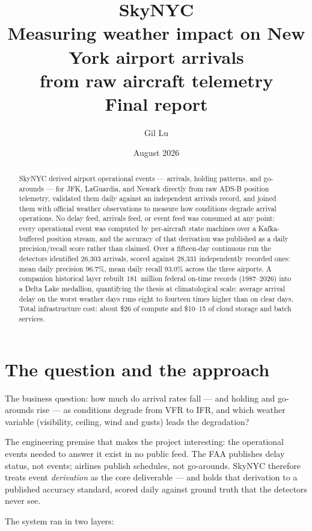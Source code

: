 \documentclass[11pt]{article}
\title{\vspace{-1.2em}\textbf{SkyNYC}\\[0.35em]
\large Measuring weather impact on New York airport arrivals\\
from raw aircraft telemetry\\[0.5em]
\normalsize Final report}
\author{Gil Lu}
\date{August 2026}
\begin{document}
\maketitle

\begin{abstract}
\noindent
SkyNYC derived airport operational events --- arrivals, holding patterns, and
go-arounds --- for JFK, LaGuardia, and Newark directly from raw ADS-B position
telemetry, validated them daily against an independent arrivals record, and
joined them with official weather observations to measure how conditions
degrade arrival operations. No delay feed, arrivals feed, or event feed was
consumed at any point: every operational event was computed by per-aircraft
state machines over a Kafka-buffered position stream, and the accuracy of that
derivation was published as a daily precision/recall score rather than claimed.
Over a fifteen-day continuous run the detectors identified 26{,}303 arrivals,
scored against 28{,}331 independently recorded ones: mean daily precision
96.7\%, mean daily recall 93.0\% across the three airports. A companion historical layer
rebuilt 181~million federal on-time records (1987--2026) into a Delta Lake
medallion, quantifying the thesis at climatological scale: average arrival
delay on the worst weather days runs eight to fourteen times higher than on
clear days. Total infrastructure cost: about \$26 of compute and \$10--15 of cloud
storage and batch services.
\end{abstract}

\section{The question and the approach}

The business question: how much do arrival rates fall --- and holding and
go-arounds rise --- as conditions degrade from VFR to IFR, and which weather
variable (visibility, ceiling, wind and gusts) leads the degradation?

The engineering premise that makes the project interesting: the operational
events needed to answer it exist in no public feed. The FAA publishes delay
status, not events; airlines publish schedules, not go-arounds. SkyNYC
therefore treats event \emph{derivation} as the core deliverable --- and holds
that derivation to a published accuracy standard, scored daily against ground
truth that the detectors never see.

The system ran in two layers:
\end{document}

